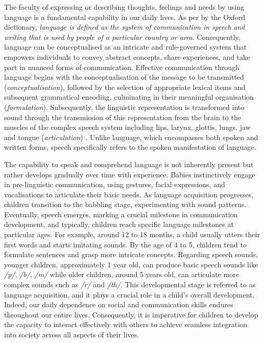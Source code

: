 \cleardoublepage
\label{chapter:1}

The faculty of expressing or describing thoughts, feelings and needs by using language is a fundamental capability in our daily lives. As per by the Oxford dictionary,  \textit{language is defined as the system of communication in speech and writing that is used by people of a particular country or area}. Consequently, language can be conceptualised as an intricate and rule-governed system that empowers individuals to convey abstract concepts, share experiences, and take part in nuanced forms of communication. Effective communication through language begins with the conceptualisation of the message to be transmitted (\textit{conceptualisation}), followed by the selection of appropriate lexical items and subsequent grammatical encoding, culminating in their meaningful organisation (\textit{formulation}). Subsequently, the linguistic representation is transformed into sound through the transmission of this representation from the brain to the muscles of the complex speech system including lips, larynx, glottis, lungs, jaw and tongue (\textit{articulation}) \cite{levelt1993speaking}. Unlike language, which encompasses both spoken and written forms, speech specifically refers to the spoken manifestation of language.


The capability to speak and comprehend language is not inherently present but rather develops gradually over time with experience. Babies instinctively engage in pre-linguistic communication, using gestures, facial expressions, and vocalisations to articulate their basic needs. As language acquisition progresses, children transition to the babbling stage, experimenting with sound patterns. Eventually, speech emerges, marking a crucial milestone in communication development, and typically, children reach specific language milestones at particular ages. For example, around 12 to 18 months, a child usually utters their first words and starts imitating sounds. By the age of 4 to 5, children tend to formulate sentences and grasp more intricate concepts. Regarding speech sounds, younger children, approximately 1 year old, can produce basic speech sounds like \textit{/p/}, \textit{/b/}, \textit{/m/} while older children, around 5 years old, can articulate more complex sounds such as \textit{/r/} and \textit{/th/}. This developmental stage is referred to as language acquisition, and it plays a crucial role in a child's overall development. Indeed, our daily dependence on social and communication skills endures throughout our entire lives. Consequently, it is imperative for children to develop the capacity to interact effectively with others to achieve seamless integration into society across all aspects of their lives.

